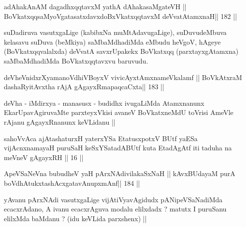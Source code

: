 
\begin{shl}
adAhakAnAM dagadhxqqtavxM yathA dAhakasaMgateVH ||
BoVkatxqqsaMyoVgatasatxdavxdoBxVkatxqqtavxM deVvatAtamxnaH\hfill || 182 ||
\end{shl}

\begin{artha}
suDadiruva vasutxgaLige (kabibxNa muMtAdavugaLige), suDuvudeMbuva kelasavu suDuva (beMkiya) saMbaMdhadiMda eMbudu heVgoV, hAgeye (BoVkatxqqvalalxda) deVvatA savxrUpakekx BoVkatxqq (parxtayxgAtamxna) saMbaMdhadiMda BoVkatxqqtavxvu baruvudu.
\end{artha}


\begin{shl}
deVheVnidxrXyamanoVdhiVBoyxV vivicAyx\s\s tAmxnameVkalamf ||
BoVkAtxraM dashaRyitAvx\s tha rAjA gAgayxRmapaqcaCxta\hfill || 183 ||
\end{shl}

\begin{artha}
deVha - iMdirxya - manasusx - budidhx ivugaLiMda Atamxnanunx EkarUpavAgiruvaMte parxteyxVkisi avaneV BoVkatxneMdU toVrisi AmeVle rAjanu gAgayxRnanunx keVLidanu || 
\end{artha}


\begin{shl}
sahoVvAca ajAtashaturxH yaterxYSa EtatusxpotxV\s
BUtf yaESa vijAcnxnamayaH puruSaH keSxYSatadABUtf
kuta EtadAgAtf iti taduha na meVneV gAgayxRH || 16 ||
\end{shl}

\begin{shl}
ApeVSaNeVna bubudheV yaH pArxNAdivilakaSxNaH ||
kAvxBUdayaM purA boVdhAtukxtashAcx\s\s gatavAnupxmAnf\hfill || 184 ||
\end{shl}

\begin{artha}
yAvanu pArxNAdi vasutxgaLige vijAtiVyavAgidudx pANipeVSaNadiMda 
ecacxrAdano, A ivanu ecacxrAguva modalu elilxdadx ? matutx I puruSanu elilxMda baMdanu ? (idu keVLida parxshenx) ||
\end{artha}


